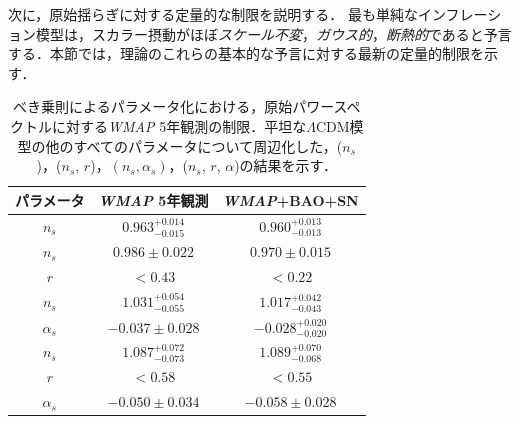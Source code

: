 
\label{sec:obs:source-duplicate-1}

次に，原始揺らぎに対する定量的な制限を説明する．
最も単純なインフレーション模型は，スカラー摂動がほぼ{\it スケール不変}，{\it ガウス的}，{\it 断熱的}であると予言する．本節では，理論のこれらの基本的な予言に対する最新の定量的制限を示す．


\vspace{0.5cm}
\begin{table}[h!]
\begin{center}
\begin{tabular}{||c|c|c||}
\hline \hline
{\small \bf パラメータ} & {\small {\sl WMAP} 5年観測} & {\small {\sl WMAP}+BAO+SN} \\
\hline
{\small $n_s$} & {\small $0.963_{-0.015}^{+0.014}$} & {\small $0.960_{-0.013}^{+0.013}$} \\
\hline
{\small $n_s$} & {\small $0.986 \pm 0.022$} & {\small $0.970 \pm 0.015$} \\
 {\small $r$} & {\small $<0.43$} & {\small $<0.22$} \\
\hline
 {\small $n_s$} & {\small $1.031_{-0.055}^{+0.054}$} & {\small $1.017_{-0.043}^{+0.042}$} \\
{\small  $\alpha_s$} & {\small $-0.037 \pm 0.028$} & {\small $-0.028_{-0.020}^{+0.020}$} \\
\hline
{\small $n_s$} & {\small $1.087_{-0.073}^{+0.072}$} & {\small $1.089_{-0.068}^{+0.070}$} \\
 {\small $r$} & {\small $<0.58$} & {\small $<0.55$} \\
{\small $\alpha_s$} & {\small $-0.050 \pm 0.034$} & {\small $-0.058 \pm 0.028$} \\
\hline \hline
\end{tabular}
\caption{ \label{tab:param} べき乗則によるパラメータ化における，原始パワースペクトルに対する{\sl WMAP} 5年観測の制限\cite{WMAP5}．平坦な$\Lambda$CDM模型の他のすべてのパラメータについて周辺化した，($n_s$)，($n_s$, $r$)，$(n_s, \alpha_s)$，($n_s$, $r$, $\alpha$)の結果を示す．}
\end{center}
\end{table}


